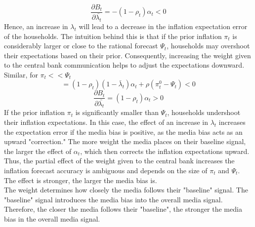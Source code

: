 \documentclass[review]{elsarticle}
\begin{document}
\begin{equation}
\frac{\partial B_t}{\partial \bar{\lambda_t}} = -(1-\rho_t)\alpha_t < 0
\end{equation}
Hence, an increase in $\lambda_t$ will lead to a decrease in the inflation expectation error of the households. The intuition behind this is that if the prior inflation $\pi_t$ is considerably larger or close to the rational forecast $\Psi_t$, households may overshoot their expectations based on their prior. Consequently, increasing the weight given to the central bank communication helps to adjust the expectations downward.
\\
Similar, for $\pi_t <<\Psi_t$
\begin{equation}
= (1-\rho_t)(1-\bar{\lambda}_t)\alpha_t + \rho(\pi_t^0 - \Psi_t) < 0
\end{equation}
\begin{equation}
\frac{\partial B_t}{\partial \bar{\lambda_t}} = (1-\rho_t)\alpha_t > 0
\end{equation}
If the prior inflation $\pi_t$ is significantly smaller than $\Psi_t$, households undershoot their inflation expectations. In this case, the effect of an increase in $\lambda_t$ increases the expectation error if the media bias is positive, as the media bias acts as an upward "correction." The more weight the media places on their baseline signal, the larger the effect of $\alpha_t$, which then corrects the inflation expectations upward.
\\ 
Thus, the partial effect of the weight given to the central bank increases the inflation forecast accuracy is ambiguous and depends on the size of $\pi_t$ and $\Psi_t$. The effect is stronger, the larger the media bias is. 
\\
The weight determines how closely the media follows their "baseline" signal. The "baseline" signal introduces the media bias into the overall media signal. Therefore, the closer the media follows their "baseline", the stronger the media bias in the overall media signal. 
\end{document}
